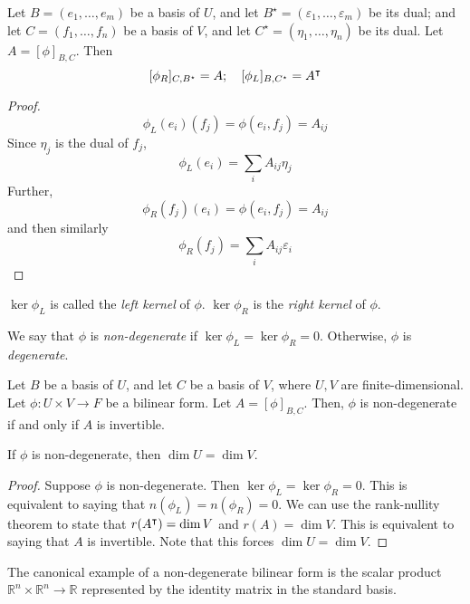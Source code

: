 \begin{lemma}
	Let \( B = (e_1, \dots, e_m) \) be a basis of \( U \), and let \( B^\star = (\varepsilon_1, \dots, \varepsilon_m) \) be its dual; and let \( C = (f_1, \dots, f_n) \) be a basis of \( V \), and let \( C^\star = (\eta_1, \dots, \eta_n) \) be its dual.
	Let \( A = [\phi]_{B,C} \).
	Then
	\[ [\phi_R]_{C, B^\star} = A;\quad [\phi_L]_{B, C^\star} = A^\intercal \]
\end{lemma}
\begin{proof}
	\[ \phi_L(e_i)(f_j) = \phi(e_i, f_j) = A_{ij} \]
	Since \( \eta_j \) is the dual of \( f_j \),
	\[ \phi_L(e_i) = \sum_i A_{ij} \eta_j \]
	Further,
	\[ \phi_R(f_j)(e_i) = \phi(e_i, f_j) = A_{ij} \]
	and then similarly
	\[ \phi_R(f_j) = \sum_i A_{ij} \varepsilon_i \]
\end{proof}
\begin{definition}
	\( \ker \phi_L \) is called the \textit{left kernel} of \( \phi \).
	\( \ker \phi_R \) is the \textit{right kernel} of \( \phi \).
\end{definition}
\begin{definition}
	We say that \( \phi \) is \textit{non-degenerate} if \( \ker \phi_L = \ker \phi_R = \qty{0} \).
	Otherwise, \( \phi \) is \textit{degenerate}.
\end{definition}
\begin{theorem}
	Let \( B \) be a basis of \( U \), and let \( C \) be a basis of \( V \), where \( U, V \) are finite-dimensional.
	Let \( \phi \colon U \times V \to F \) be a bilinear form.
	Let \( A = [\phi]_{B,C} \).
	Then, \( \phi \) is non-degenerate if and only if \( A \) is invertible.
\end{theorem}
\begin{corollary}
	If \( \phi \) is non-degenerate, then \( \dim U = \dim V \).
\end{corollary}
\begin{proof}
	Suppose \( \phi \) is non-degenerate.
	Then \( \ker \phi_L = \ker \phi_R = \qty{0} \).
	This is equivalent to saying that \( n(\phi_L) = n(\phi_R) = 0 \).
	We can use the rank-nullity theorem to state that \( r(A^\intercal) = \dim V \) and \( r(A) = \dim V \).
	This is equivalent to saying that \( A \) is invertible.
	Note that this forces \( \dim U = \dim V \).
\end{proof}
\begin{remark}
	The canonical example of a non-degenerate bilinear form is the scalar product \( \mathbb R^n \times \mathbb R^n \to \mathbb R \) represented by the identity matrix in the standard basis.
\end{remark}
